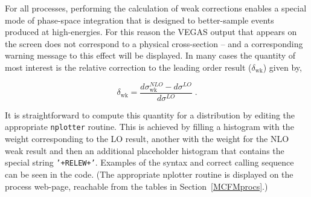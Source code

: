For all processes, performing the calculation of weak
corrections enables a special mode of phase-space integration that is designed to
better-sample events produced at high-energies.  For this reason the VEGAS output that
appears on the screen does not correspond to a physical cross-section -- and a corresponding
warning message to this effect will be displayed.  In many cases the quantity of most interest
is the relative correction to the leading order result ($\delta_{\mathrm{wk}}$) given by,

\begin{equation}
\delta_{\mathrm{wk}} = \frac{d\sigma_{\mathrm{wk}}^{NLO} - d\sigma^{LO}}{d\sigma^{LO}} \;.
\end{equation}

It is straightforward to compute this quantity for a distribution by editing the appropriate
{\tt nplotter} routine.
This is achieved by filling a histogram with the weight corresponding
to the LO result, another with the weight for the NLO weak result and then an additional placeholder
histogram that contains the special string {\tt '+RELEW+'}.  Examples of the syntax and correct calling
sequence can be seen in the code. (The appropriate nplotter routine is displayed on the process web-page, reachable from 
the tables in Section~\ref{MCFMprocs}.)



% 
% 
% 


